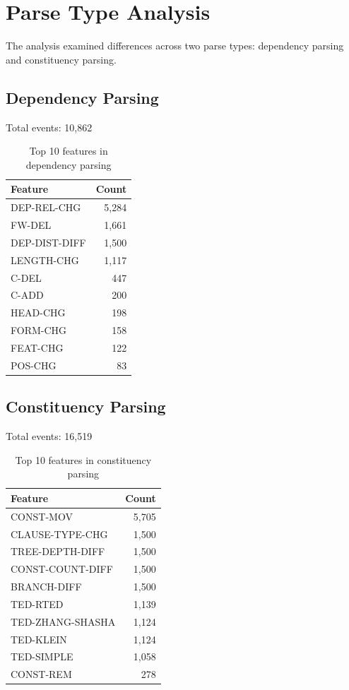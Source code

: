 \documentclass[11pt,a4paper]{article}
\begin{document}
\section{Parse Type Analysis}

The analysis examined differences across two parse types: dependency parsing and constituency parsing.

\subsection{Dependency Parsing}

Total events: 10,862

\begin{table}[h]
\centering
\begin{tabular}{lr}
\toprule
Feature & Count \\
\midrule
DEP-REL-CHG & 5,284 \\
FW-DEL & 1,661 \\
DEP-DIST-DIFF & 1,500 \\
LENGTH-CHG & 1,117 \\
C-DEL & 447 \\
C-ADD & 200 \\
HEAD-CHG & 198 \\
FORM-CHG & 158 \\
FEAT-CHG & 122 \\
POS-CHG & 83 \\
\bottomrule
\end{tabular}
\caption{Top 10 features in dependency parsing}
\end{table}

\subsection{Constituency Parsing}

Total events: 16,519

\begin{table}[h]
\centering
\begin{tabular}{lr}
\toprule
Feature & Count \\
\midrule
CONST-MOV & 5,705 \\
CLAUSE-TYPE-CHG & 1,500 \\
TREE-DEPTH-DIFF & 1,500 \\
CONST-COUNT-DIFF & 1,500 \\
BRANCH-DIFF & 1,500 \\
TED-RTED & 1,139 \\
TED-ZHANG-SHASHA & 1,124 \\
TED-KLEIN & 1,124 \\
TED-SIMPLE & 1,058 \\
CONST-REM & 278 \\
\bottomrule
\end{tabular}
\caption{Top 10 features in constituency parsing}
\end{table}
\end{document}
